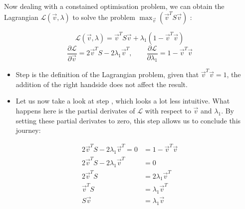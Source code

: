 Now dealing with a constained optimisation problem, we can obtain the Lagrangian $\mathcal{L}(\overrightarrow{v}, \lambda)$ to solve the problem $\max_{\overrightarrow{v}} (\overrightarrow{v}^T S \overrightarrow{v})$ \cite{deisenroth2020mathematics}:

\begin{equation}
	\label{formula:maxOptimisationI}
	\mathcal{L}(\overrightarrow{v}, \lambda) = \overrightarrow{v}^T S \overrightarrow{v} + \lambda_1 (1 - \overrightarrow{v}^T\overrightarrow{v})
\end{equation}
\begin{equation}
	\label{formula:maxOptimisationII}
	\frac{\partial \mathcal{L}}{\partial \overrightarrow{v}} = 2 \overrightarrow{v}^T S - 2 \lambda_1 \overrightarrow{v}^T,
	\quad \quad
	\frac{\partial \mathcal{L}}{\partial \lambda_1} = 1 - \overrightarrow{v}^T \overrightarrow{v}
\end{equation}

\vspace{2mm}

\begin{itemize}
	\item Step  is the definition of the Lagrangian problem, given that $\overrightarrow{v}^T\overrightarrow{v}=1$, the addition of the right handside does not affect the result.
	\item Let us now take a look at step , which looks a lot less intuitive. 
	What happens here is the partial derivates of $\mathcal{L}$ with respect to $\overrightarrow{v}$ and $\lambda_1$.
	By setting these partial derivates to zero, this step allows us to conclude this journey:
\end{itemize}

\vspace{-16mm}
{
\begin{align}
	\label{formula:maxOptimisationIII}
	2 \overrightarrow{v}^T S - 2 \lambda_1 \overrightarrow{v}^T = 0 &= 1 - \overrightarrow{v}^T \overrightarrow{v}
	\\
	\label{formula:maxOptimisationIV}
	2 \overrightarrow{v}^T S - 2 \lambda_1 \overrightarrow{v}^T &= 0
	\\
	\label{formula:maxOptimisationV}
	2 \overrightarrow{v}^T S &= 2 \lambda_1 \overrightarrow{v}^T
	\\
	\label{formula:maxOptimisationVI}
	\overrightarrow{v}^T S &= \lambda_1 \overrightarrow{v}^T
	\\
	\label{formula:maxOptimisationVII}
	S \overrightarrow{v} &= \lambda_1 \overrightarrow{v}
\end{align}
}

